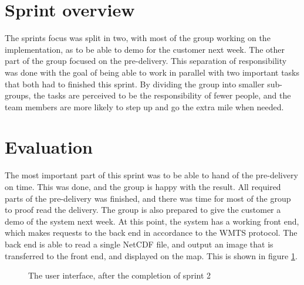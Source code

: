 \documentclass[11pt,a4paper,titlepage,oneside]{report}
\begin{document}
\section{Sprint overview}
The sprints focus was split in two, with most of the group working on the implementation, as to be able to demo for the customer next week. The other part of the group focused on the pre-delivery. This separation of responsibility was done with the goal of being able to work in parallel with two important tasks that both had to finished this sprint. By dividing the group into smaller sub-groups, the tasks are perceived to be the responsibility of fewer people, and the team members are more likely to step up and go the extra mile when needed. 

\section{Evaluation}
The most important part of this sprint was to be able to hand of the pre-delivery on time. This was done, and the group is happy with the result. All required parts of the pre-delivery was finished, and there was time for most of the group to proof read the delivery. The group is also prepared to give the customer a demo of the system next week. At this point, the system has a working front end, which makes requests to the back end in accordance to the WMTS protocol. The back end is able to read a single NetCDF file, and output an image that is transferred to the front end, and displayed on the map. This is shown in figure \ref{fig:UIAfterSprint2}.

\begin{figure}[h]
\begin{center}
\caption{The user interface, after the completion of sprint 2}
\label{fig:UIAfterSprint2}
\end{center}
\end{figure}
\end{document}
